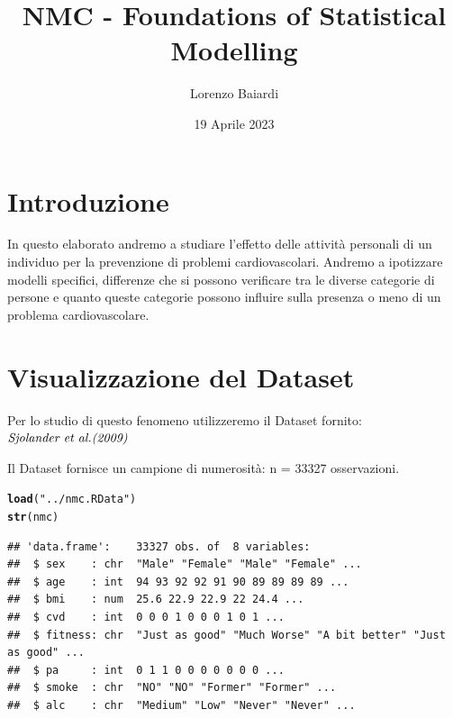 \documentclass{article}\usepackage[]{graphicx}\usepackage[]{xcolor}
\title{NMC - Foundations of Statistical Modelling}
\author{Lorenzo Baiardi}
\date{19 Aprile 2023}
\makeatletter
\newcommand{\hlstr}[1]{\textcolor[rgb]{0.192,0.494,0.8}{#1}}%
\newcommand{\hlstd}[1]{\textcolor[rgb]{0.345,0.345,0.345}{#1}}%
\newcommand{\hlkwd}[1]{\textcolor[rgb]{0.737,0.353,0.396}{\textbf{#1}}}%
\newenvironment{kframe}{%
 \def\at@end@of@kframe{}%
 \ifinner\ifhmode%
  \def\at@end@of@kframe{\end{minipage}}%
  \begin{minipage}{\columnwidth}%
 \fi\fi%
 \def\FrameCommand##1{\hskip\@totalleftmargin \hskip-\fboxsep
 \colorbox{shadecolor}{##1}\hskip-\fboxsep
     \hskip-\linewidth \hskip-\@totalleftmargin \hskip\columnwidth}%
 \MakeFramed {\advance\hsize-\width
   \@totalleftmargin\z@ \linewidth\hsize
   \@setminipage}}%
 {\par\unskip\endMakeFramed%
 \at@end@of@kframe}
\newenvironment{knitrout}{}{} %
\makeatother
\begin{document}
\maketitle

\clearpage

\tableofcontents

\clearpage


\section{Introduzione}
  In questo elaborato andremo a studiare l'effetto delle attività personali di un 
  individuo per la prevenzione di problemi cardiovascolari. Andremo a ipotizzare
  modelli specifici, differenze che si possono verificare tra le diverse categorie
  di persone e quanto queste categorie possono influire sulla presenza o meno
  di un problema cardiovascolare.


\section{Visualizzazione del Dataset} 
  Per lo studio di questo fenomeno utilizzeremo il Dataset fornito: 
  $\emph{Sjolander et al.(2009)}$ \par
  Il Dataset fornisce un campione di numerosità: n = 33327 osservazioni. 
  
\begin{knitrout}
\color{fgcolor}\begin{kframe}
\begin{alltt}
\hlkwd{load}\hlstd{(}\hlstr{"../nmc.RData"}\hlstd{)}
\hlkwd{str}\hlstd{(nmc)}
\end{alltt}
\begin{verbatim}
## 'data.frame':	33327 obs. of  8 variables:
##  $ sex    : chr  "Male" "Female" "Male" "Female" ...
##  $ age    : int  94 93 92 92 91 90 89 89 89 89 ...
##  $ bmi    : num  25.6 22.9 22.9 22 24.4 ...
##  $ cvd    : int  0 0 0 1 0 0 0 1 0 1 ...
##  $ fitness: chr  "Just as good" "Much Worse" "A bit better" "Just as good" ...
##  $ pa     : int  0 1 1 0 0 0 0 0 0 0 ...
##  $ smoke  : chr  "NO" "NO" "Former" "Former" ...
##  $ alc    : chr  "Medium" "Low" "Never" "Never" ...
\end{verbatim}
\end{kframe}
\end{knitrout}
 
\end{document}
